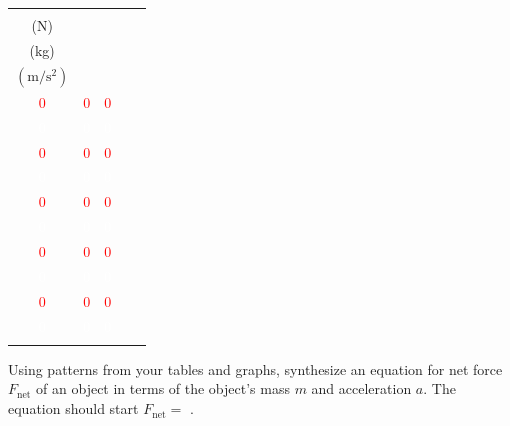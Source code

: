 \documentclass[answers]{exam}
\begin{document}
\begin{questions}
\begin{EnvUplevel}
\centering

\begin{minipage}{7.5cm}
\centering
\bgroup
\def\arraystretch{1.5}
\newcommand{\answertableentry}[3]{%
  \ifprintanswers
    \textcolor{red}{#1} & \textcolor{red}{#2} & \textcolor{red}{#3} \\ \hline
  \else
    \textcolor{white}{#1} & \textcolor{white}{#2} & \textcolor{white}{#3} \\ \hline
  \fi
}

\begin{tabular}{|c|c|c|c|c|}
  \hline
  \thead{\textbf{Net Force}, $F_\mathrm{net}$\\(N)} & \thead{\textbf{Mass}, $m$\\(kg)} & \thead{\textbf{Acceleration}, $a$\\$\left(\mathrm{m/s^2}\right)$}\\ \hline
  \answertableentry{0}{0}{0}
  \answertableentry{0}{0}{0}
  \answertableentry{0}{0}{0}
  \answertableentry{0}{0}{0}
  \answertableentry{0}{0}{0}
\end{tabular}
\egroup
\end{minipage}%
\hspace{5mm}
\begin{minipage}{6.5cm}
\centering
{}
\end{minipage}
\end{EnvUplevel}


\question
Using patterns from your tables and graphs, synthesize an equation for net force $F_{\mathrm{net}}$ of an object in terms of the object's mass $m$ and acceleration $a$. The equation should start $F_\mathrm{net} = $ \hfill .

\ifprintanswers
\else
\fillwithlines{7mm}
\fi

\end{questions}
\end{document}
